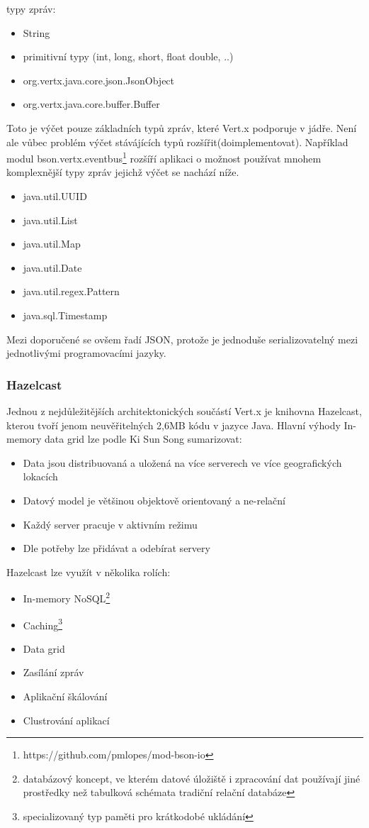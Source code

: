 typy zpráv:
\begin{itemize}
\item{String}
\item{primitivní typy (int, long, short, float double, ..)}
\item{org.vertx.java.core.json.JsonObject}
\item{org.vertx.java.core.buffer.Buffer}
\end{itemize}

Toto je výčet pouze základních typů zpráv, které Vert.x podporuje v jádře. Není ale vůbec problém výčet stávájících typů rozšířit(doimplementovat). Například modul bson.vertx.eventbus\footnote{https://github.com/pmlopes/mod-bson-io} rozšíří aplikaci o možnost používat mnohem komplexnější typy zpráv jejichž výčet se nachází níže.

\begin{itemize}
\item{java.util.UUID}
\item{java.util.List}
\item{java.util.Map}
\item{java.util.Date}
\item{java.util.regex.Pattern}
\item{java.sql.Timestamp}
\end{itemize}

Mezi doporučené se ovšem řadí JSON, protože je jednoduše serializovatelný mezi jednotlivými programovacími jazyky.

\subsubsection{Hazelcast}

Jednou z nejdůležitějších architektonických součástí Vert.x je knihovna Hazelcast, kterou tvoří jenom neuvěřitelných 2,6MB kódu v jazyce Java. Hlavní výhody In-memory data grid\cite{inMemoryDataGrid} lze podle Ki Sun Song sumarizovat:
\begin{itemize}
\item{Data jsou distribuovaná a uložená na více serverech ve více geografických lokacích}
\item{Datový model je většinou objektově orientovaný a ne-relační}
\item{Každý server pracuje v aktivním režimu}
\item{Dle potřeby lze přidávat a odebírat servery}
\end{itemize}

Hazelcast lze využít v několika rolích:
\begin{itemize}
\item{In-memory NoSQL\footnote{databázový koncept, ve kterém datové úložiště i zpracování dat používají jiné prostředky než tabulková schémata tradiční relační databáze}}
\item{Caching\footnote{specializovaný typ paměti pro krátkodobé ukládání}}
\item{Data grid}
\item{Zasílání zpráv}
\item{Aplikační škálování}
\item{Clustrování aplikací}
\end{itemize}

